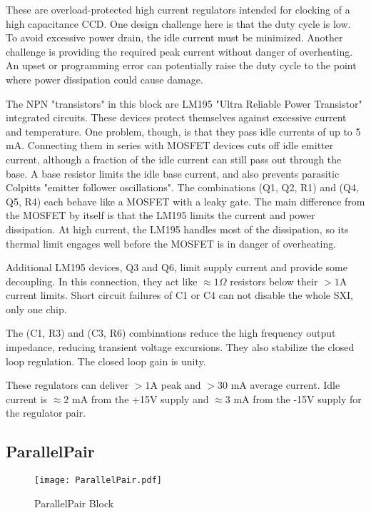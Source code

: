 \documentclass[a4paper,12pt]{article}
\begin{document}
These are overload-protected high current regulators intended for clocking of a high capacitance CCD. One design challenge here is that the duty cycle is low. To avoid excessive power drain, the idle current must be minimized. Another challenge is providing the required peak current without danger of overheating. An upset or programming error can  potentially raise the duty cycle to the point where power dissipation could cause damage.

The NPN "transistors" in this block are LM195 "Ultra Reliable Power Transistor" integrated circuits. These devices protect themselves against excessive current and temperature. One problem, though, is that they pass idle currents of up to 5 mA. Connecting them in series with MOSFET devices cuts off idle emitter current, although a fraction of the idle current can still pass out through the base. A base resistor limits the idle base current, and also prevents parasitic Colpitts "emitter follower oscillations". The combinations (Q1, Q2, R1) and (Q4, Q5, R4) each behave like a MOSFET with a leaky gate. The main difference from the MOSFET by itself is that the LM195 limits the current and power dissipation. At high current, the LM195 handles most of the dissipation, so its thermal limit engages well before the MOSFET  is in danger of overheating.

Additional LM195 devices, Q3 and Q6, limit supply current and provide some decoupling. In this connection, they act like $\approx 1\Omega$ resistors below their $>1$A current limits. Short circuit failures of C1 or C4 can not disable the whole SXI, only one chip.

The (C1, R3) and (C3, R6) combinations reduce the high frequency output impedance, reducing transient voltage excursions. They also stabilize the closed loop regulation. The closed loop gain is unity.

These regulators can deliver $>1$A peak and $>30$ mA average current. Idle current is  $\approx 2$ mA from the +15V supply and $\approx 3$ mA from the -15V supply for the regulator pair.

\subsection{ParallelPair}

   \begin{figure}
   \begin{center}
   \texttt{[image: ParallelPair.pdf]}
   \end{center}
   \caption{ParallelPair Block}
   \end{figure}
\end{document}
